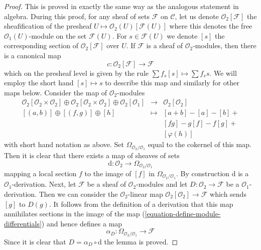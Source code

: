 \begin{proof}
This is proved in exactly the same way as the analogous statement in algebra.
During this proof, for any sheaf of sets $\mathcal{F}$ on $\mathcal{C}$,
let us denote $\mathcal{O}_2[\mathcal{F}]$ the sheafification of the
presheaf $U \mapsto \mathcal{O}_2(U)[\mathcal{F}(U)]$ where this denotes
the free $\mathcal{O}_1(U)$-module on the set $\mathcal{F}(U)$.
For $s \in \mathcal{F}(U)$ we denote $[s]$ the corresponding section
of $\mathcal{O}_2[\mathcal{F}]$ over $U$. If $\mathcal{F}$ is a sheaf of
$\mathcal{O}_2$-modules, then there is a canonical map
$$
c : \mathcal{O}_2[\mathcal{F}] \longrightarrow \mathcal{F}
$$
which on the presheaf level is given by the rule
$\sum f_s[s] \mapsto \sum f_s s$. We will employ the short hand
$[s] \mapsto s$ to
describe this map and similarly for other maps below. Consider
the map of $\mathcal{O}_2$-modules
\begin{equation}
\label{equation-define-module-differentials}
\begin{matrix}
\mathcal{O}_2[\mathcal{O}_2 \times \mathcal{O}_2] \oplus
\mathcal{O}_2[\mathcal{O}_2 \times \mathcal{O}_2] \oplus
\mathcal{O}_2[\mathcal{O}_1] &
\longrightarrow &
\mathcal{O}_2[\mathcal{O}_2] \\
[(a, b)] \oplus [(f, g)] \oplus [h] & \longmapsto & [a + b] - [a] - [b] + \\
& & [fg] - g[f] - f[g] + \\
& & [\varphi(h)]
\end{matrix}
\end{equation}
with short hand notation as above. Set $\Omega_{\mathcal{O}_2/\mathcal{O}_1}$
equal to the cokernel of this map. Then it is clear that there exists
a map of sheaves of sets
$$
\text{d} : \mathcal{O}_2 \longrightarrow \Omega_{\mathcal{O}_2/\mathcal{O}_1}
$$
mapping a local section $f$ to the image of $[f]$ in
$\Omega_{\mathcal{O}_2/\mathcal{O}_1}$. By construction $\text{d}$
is a $\mathcal{O}_1$-derivation. Next, let $\mathcal{F}$
be a sheaf of $\mathcal{O}_2$-modules and let
$D : \mathcal{O}_2 \to \mathcal{F}$ be a $\mathcal{O}_1$-derivation.
Then we can consider the $\mathcal{O}_2$-linear map
$\mathcal{O}_2[\mathcal{O}_2] \to \mathcal{F}$ which sends $[g]$ to $D(g)$.
It follows from the definition of a derivation that this map annihilates
sections in the image of the map (\ref{equation-define-module-differentials})
and hence defines a map
$$
\alpha_D : \Omega_{\mathcal{O}_2/\mathcal{O}_1} \longrightarrow \mathcal{F}
$$
Since it is clear that $D = \alpha_D \circ \text{d}$ the lemma is proved.
\end{proof}


